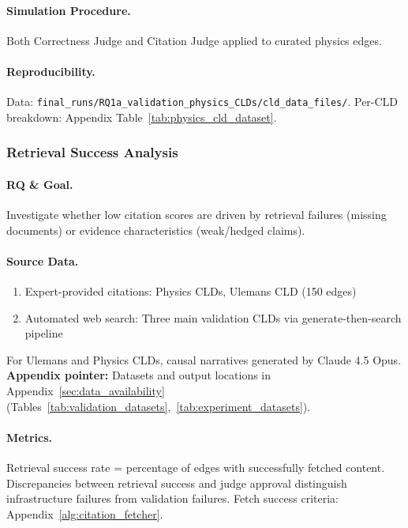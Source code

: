 \paragraph{Simulation Procedure.}
Both Correctness Judge and Citation Judge applied to curated physics edges.

\paragraph{Reproducibility.}
Data: \texttt{final\_runs/RQ1a\_validation\_physics\_CLDs/cld\_data\_files/}. Per-CLD breakdown: Appendix Table~\ref{tab:physics_cld_dataset}.

\subsubsection{Retrieval Success Analysis}
\label{sec:retrieval_success}

\paragraph{RQ \& Goal.}
Investigate whether low citation scores are driven by retrieval failures (missing documents) or evidence characteristics (weak/hedged claims).

\paragraph{Source Data.}
\begin{enumerate}[noitemsep]
    \item Expert-provided citations: Physics CLDs, Ulemans CLD (150 edges)
    \item Automated web search: Three main validation CLDs via generate-then-search pipeline
\end{enumerate}
For Ulemans and Physics CLDs, causal narratives generated by Claude 4.5 Opus.
\textbf{Appendix pointer:} Datasets and output locations in Appendix~\ref{sec:data_availability} (Tables~\ref{tab:validation_datasets},~\ref{tab:experiment_datasets}).

\paragraph{Metrics.}
Retrieval success rate = percentage of edges with successfully fetched content. Discrepancies between retrieval success and judge approval distinguish infrastructure failures from validation failures. Fetch success criteria: Appendix~\ref{alg:citation_fetcher}.

